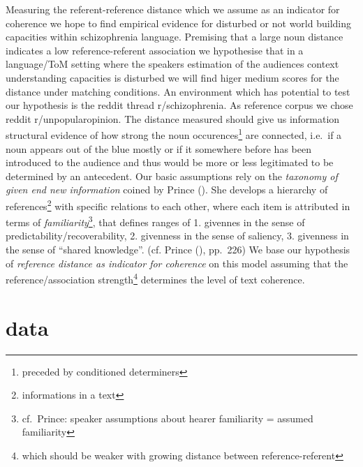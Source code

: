 \documentclass[
  12pt,
  oneside]{book}
\begin{document}
Measuring the referent-reference distance which we assume as an indicator for coherence we hope to find empirical evidence for disturbed or not world building capacities within schizophrenia language. Premising that a large noun distance indicates a low reference-referent association we hypothesise that in a language/ToM setting where the speakers estimation of the audiences context understanding capacities is disturbed we will find higer medium scores for the distance under matching conditions. An environment which has potential to test our hypothesis is the reddit thread r/schizophrenia. As reference corpus we chose reddit r/unpopularopinion.
The distance measured should give us information structural evidence of how strong the noun occurences\footnote{preceded by conditioned determiners} are connected, i.e.~if a noun appears out of the blue mostly or if it somewhere before has been introduced to the audience and thus would be more or less legitimated to be determined by an antecedent.
Our basic assumptions rely on the \emph{taxonomy of given end new information} coined by Prince (). She develops a hierarchy of references\footnote{informations in a text} with specific relations to each other, where each item is attributed in terms of \emph{familiarity}\footnote{cf.~Prince: speaker assumptions about hearer familiarity = assumed familiarity}, that defines ranges of 1. givennes in the sense of predictability/recoverability, 2. givenness in the sense of saliency, 3. givenness in the sense of ``shared knowledge''. (cf. Prince (), pp.~226) We base our hypothesis of \emph{reference distance as indicator for coherence} on this model assuming that the reference/association strength\footnote{which should be weaker with growing distance between reference-referent} determines the level of text coherence.

\section{data}\label{data}
\end{document}
